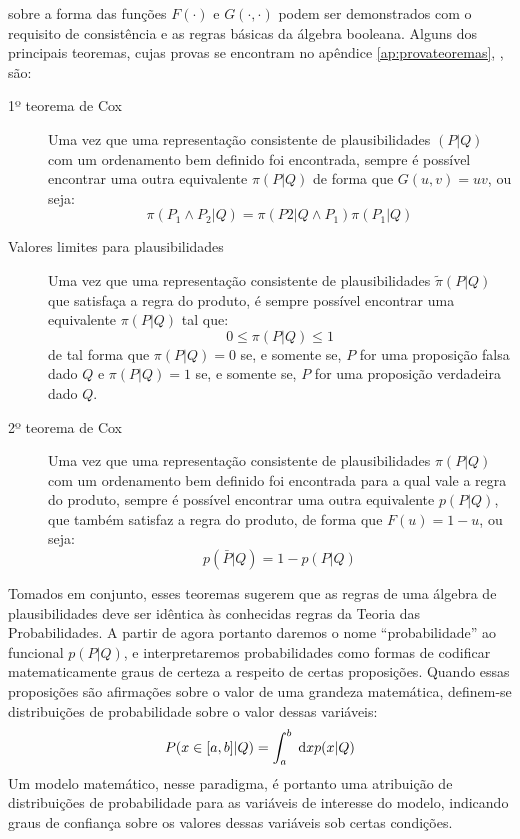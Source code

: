  sobre a forma das funções $F(\cdot)$ e $G(\cdot,\cdot)$ podem ser demonstrados com o requisito de consistência e as regras básicas da álgebra booleana. Alguns dos principais teoremas, cujas provas se encontram no apêndice \ref{ap:provateoremas}, \emph{}, são:
\begin{description}
 \item[1º teorema de Cox]
\begin{Teorema}
    Uma vez que uma representação consistente de plausibilidades $(P|Q)$ com um ordenamento bem definido foi encontrada, sempre é possível encontrar uma outra equivalente $\pi(P|Q)$ de forma que $G(u,v) = uv$, ou seja:
    \begin{equation}
	\label{eq:productrule}
	\pi(P_1\wedge P_2|Q) = \pi(P2 | Q \wedge P_1) \pi(P_1| Q)
    \end{equation}
\end{Teorema}

\item[Valores limites para plausibilidades]
\begin{Teorema}
  Uma vez que uma representação consistente de plausibilidades $\tilde{\pi}(P|Q)$ que satisfaça a regra do produto, é sempre possível encontrar uma equivalente $\pi(P|Q)$ tal que:
 \begin{equation}
    0 \le \pi(P|Q) \le 1
 \end{equation}
 de tal forma que $\pi(P|Q) = 0$ se, e somente se, $P$ for uma proposição falsa dado $Q$ e $\pi(P|Q) = 1$ se, e somente se, $P$ for uma proposição verdadeira dado $Q$.
\end{Teorema}
\item[2º teorema de Cox]
\begin{Teorema}
 Uma vez que uma representação consistente de plausibilidades $\pi(P|Q)$ com um ordenamento bem definido foi encontrada para a qual vale a regra do produto, sempre é possível encontrar uma outra equivalente $p(P|Q)$, que também satisfaz a regra do produto, de forma que $F(u) = 1 - u$, ou seja:
 \begin{equation}
 p(\bar{P} | Q) = 1 - p(P|Q)
 \end{equation}
\end{Teorema}
\end{description}

Tomados em conjunto, esses teoremas sugerem que as regras de uma álgebra de plausibilidades deve ser idêntica às conhecidas regras da Teoria das Probabilidades. A partir de agora portanto daremos o nome ``probabilidade'' ao funcional $p(P|Q)$, e interpretaremos probabilidades como formas de codificar matematicamente graus de certeza a respeito de certas proposições. Quando essas proposições são afirmações sobre o valor de uma grandeza matemática, definem-se distribuições de probabilidade sobre o valor dessas variáveis:
\begin{equation}
 P(x \in [a,b] | Q) = \int_{a}^{b}\;\mathrm{d} x p(x | Q)
\end{equation}
Um modelo matemático, nesse paradigma, é portanto uma atribuição de distribuições de probabilidade para as variáveis de interesse do modelo, indicando graus de confiança sobre os valores dessas variáveis sob certas condições. 

